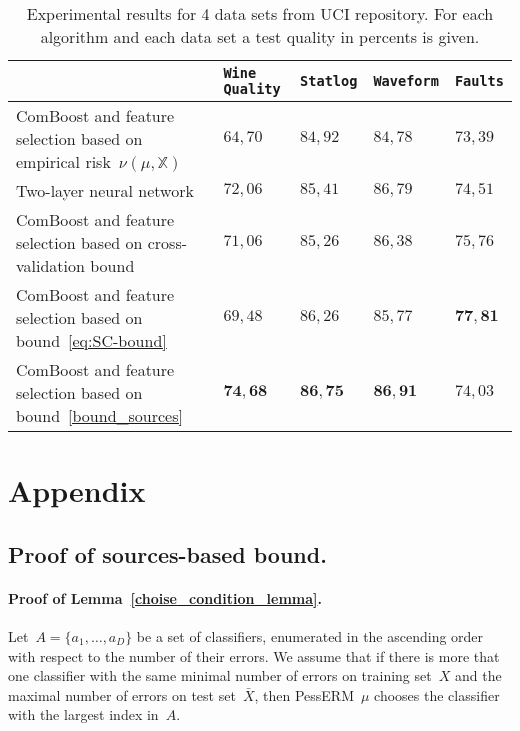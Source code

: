 \documentclass{article}
\def\AA{A}
\begin{document}
\begin{table}[t]
    \begin{tabular}{| m{50mm} | m{15mm} | m{15mm} | m{15mm} | m{15mm} |}
    \hline
            &   \texttt{Wine Quality}
            &   \texttt{Statlog}
            &   \texttt{Waveform}
            &   \texttt{Faults}     \\ \hline

        ComBoost and feature selection based on empirical risk~$\nu(\mu, \mathbb{X})$
            &   $64,70$
            &   $84,92$
            &   $84,78$
            &   $73,39$    \\ \hline

        Two-layer neural network
            &   $72,06$
            &   $85,41$
            &   $86,79$
            &   $74,51$    \\ \hline

        ComBoost and feature selection based on cross-validation bound
            &   $71,06$
            &   $85,26$
            &   $86,38$
            &   $75,76$    \\ \hline

        ComBoost and feature selection based on bound~\eqref{eq:SC-bound}
            &   $69,48$
            &   $86,26$
            &   $85,77$
            &   $\boldsymbol{77,81}$    \\ \hline

        ComBoost and feature selection based on bound~\eqref{bound_sources}
            &   $\boldsymbol{74,68}$
            &   $\boldsymbol{86,75}$
            &   $\boldsymbol{86,91}$
            &   $74,03$    \\ \hline
    \end{tabular}
    \caption{Experimental results for 4 data sets from UCI repository.
        For each algorithm and each data set a test quality in percents is given.}
    \label{lin_classifiers_results}
\end{table}

\section{Appendix}
\subsection{Proof of sources-based bound.}
\paragraph{Proof of Lemma~\ref{choise_condition_lemma}.}
Let~$\AA = \{a_1, \dots, a_D\}$ be a set of classifiers,
enumerated in the ascending order with respect to the number of their errors.
We assume that if there is more that one classifier with the same minimal number of errors on training set~$X$
and the maximal number of errors on test set~$\bar X$,
then PessERM~$\mu$ chooses the classifier with the largest index in~$\AA$.
\end{document}
